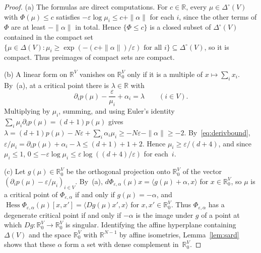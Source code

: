 \documentclass[11pt]{article}
\theoremstyle{definition}
\numberwithin{equation}{section}
\newcommand{\R}{\mathbb R}
\DeclareMathOperator{\Hess}{Hess}
\begin{document}
\begin{proof}
(a) The formulas are direct computations. For $c\in\R$, every $\mu\in\Delta^\circ(V)$ with $\Phi(\mu)\le c$ satisfies $-\varepsilon\log\mu_i\le c+\|\alpha\|$ for each $i$, since the other terms of $\Phi$ are at least $-\|\alpha\|$ in total. Hence $\{\Phi\le c\}$ is a closed subset of $\Delta^\circ(V)$ contained in the compact set $\{\mu\in\Delta(V):\mu_i\ge\exp(-(c+\|\alpha\|)/\varepsilon)\text{ for all }i\}\subseteq\Delta^\circ(V)$, so it is compact. Thus preimages of compact sets are compact.

(b) A linear form on $\R^V$ vanishes on $\R^V_0$ only if it is a multiple of $x\mapsto\sum_ix_i$. By~(a), at a critical point there is $\lambda\in\R$ with
\begin{equation*}
 \partial_ip(\mu)-\frac\varepsilon{\mu_i}+\alpha_i=\lambda\qquad(i\in V).
\end{equation*}
Multiplying by $\mu_i$, summing, and using Euler's identity $\sum_i\mu_i\partial_ip(\mu)=(d+1)p(\mu)$ gives $\lambda=(d+1)p(\mu)-N\varepsilon+\sum_i\alpha_i\mu_i\ge-N\varepsilon-\|\alpha\|\ge-2$. By~\eqref{eq:derivbound}, $\varepsilon/\mu_i=\partial_ip(\mu)+\alpha_i-\lambda\le(d+1)+1+2$. Hence $\mu_i\ge\varepsilon/(d+4)$, and since $\mu_i\le1$, $0\le-\varepsilon\log\mu_i\le\varepsilon\log((d+4)/\varepsilon)$ for each~$i$.

(c) Let $g(\mu)\in\R^V_0$ be the orthogonal projection onto $\R^V_0$ of the vector $(\partial_ip(\mu)-\varepsilon/\mu_i)_{i\in V}$. By~(a), $d\Phi_{\varepsilon,\alpha}(\mu)x=\langle g(\mu)+\alpha,x\rangle$ for $x\in\R^V_0$, so $\mu$ is a critical point of $\Phi_{\varepsilon,\alpha}$ if and only if $g(\mu)=-\alpha$, and $\Hess\Phi_{\varepsilon,\alpha}(\mu)[x,x']=\langle Dg(\mu)x',x\rangle$ for $x,x'\in\R^V_0$. Thus $\Phi_{\varepsilon,\alpha}$ has a degenerate critical point if and only if $-\alpha$ is the image under $g$ of a point at which $Dg:\R^V_0\to\R^V_0$ is singular. Identifying the affine hyperplane containing $\Delta(V)$ and the space $\R^V_0$ with $\R^{N-1}$ by affine isometries, Lemma~\ref{lem:sard} shows that these $\alpha$ form a set with dense complement in~$\R^V_0$.
\end{proof}
\end{document}
